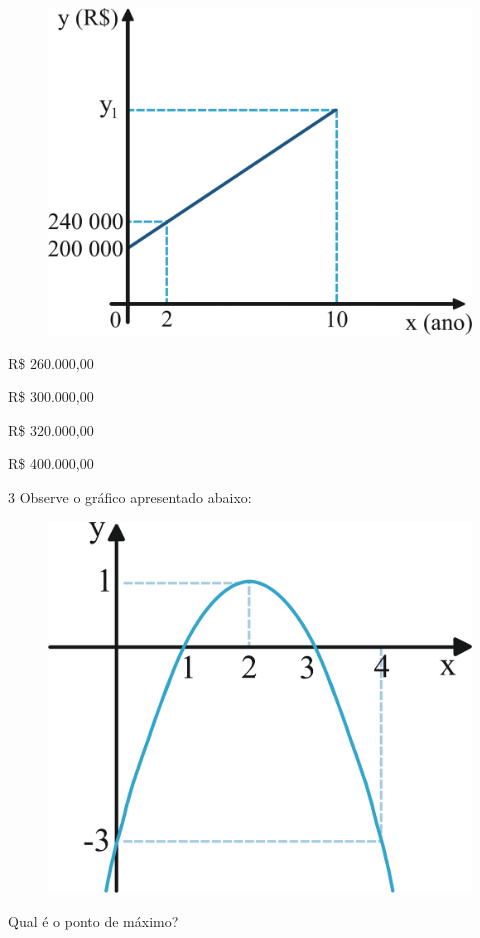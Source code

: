 \begin{figure}[htpb!]
\centering
\includegraphics[width=.7\textwidth]{./ilustras-mat/modulo_9-treino_2.png}
\end{figure}

\begin{escolha}
\item R\$ 260.000,00

\item R\$ 300.000,00

\item R\$ 320.000,00

\item R\$ 400.000,00
\end{escolha}

\pagebreak
\num{3} Observe o gráfico apresentado abaixo:

\begin{figure}[htpb!]
\centering
\includegraphics[width=.7\textwidth]{./ilustras-mat/modulo_9-treino_3.png}
\end{figure}

Qual é o ponto de máximo?

